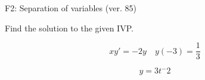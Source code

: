 \begin{exercise}
  \begin{exerciseTitle}F2: Separation of variables (ver. 85)\end{exerciseTitle}
  \begin{exerciseStatement}
    
Find the solution to the given IVP.

    
\[xy'= -2 y \hspace{1em} y( -3 ) = \frac{1}{3}\]

  \end{exerciseStatement}
  \begin{exerciseAnswer}
    
\[y= 3 t^ -2\]

  \end{exerciseAnswer}
\end{exercise}